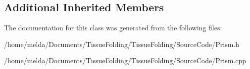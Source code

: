 \subsection*{Additional Inherited Members}


The documentation for this class was generated from the following files\+:\begin{DoxyCompactItemize}
\item 
/home/melda/\+Documents/\+Tissue\+Folding/\+Tissue\+Folding/\+Source\+Code/Prism.\+h\item 
/home/melda/\+Documents/\+Tissue\+Folding/\+Tissue\+Folding/\+Source\+Code/Prism.\+cpp\end{DoxyCompactItemize}
